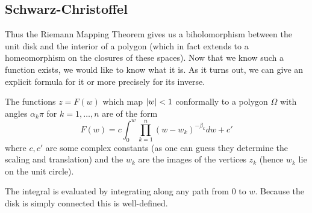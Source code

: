 \subsection{Schwarz-Christoffel}
Thus the Riemann Mapping Theorem gives us a biholomorphism between the unit disk and the interior of a polygon (which in fact extends to a homeomorphism on the closures of these spaces). Now that we know such a function exists, we would like to know what it is. As it turns out, we can give an explicit formula for it or more precisely for its inverse.
\begin{theorem}
    The functions $z = F(w)$ which map $\left|w\right| < 1$ conformally to a polygon $\Omega$ with angles $\alpha_k \pi$ for $k = 1, \dots, n$ are of the form 
    $$F(w) = c \int_0^w \prod_{k = 1}^n (w - w_k)^{-\beta_k} dw + c' $$
    where $c, c'$ are some complex constants (as one can guess they determine the scaling and translation) and the $w_k$ are the images of the vertices $z_k$ (hence $w_k$ lie on the unit circle).
\end{theorem}
\begin{remark}
    The integral is evaluated by integrating along any path from 0 to $w$. Because the disk is simply connected this is well-defined.
\end{remark}

